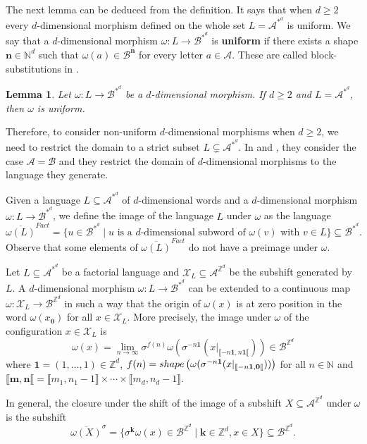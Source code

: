 \documentclass[12pt]{amsart}
\newtheorem{lemma}[definition]{Lemma}
\newcommand{\N}{\mathbb{N}}
\newcommand{\Z}{\mathbb{Z}}
\newcommand{\zero}{{\boldsymbol{0}}}
\newcommand{\UN}{{\boldsymbol{1}}}
\newcommand{\bk}{{\boldsymbol{k}}}
\newcommand{\bn}{{\boldsymbol{n}}}
\newcommand{\Bm}{{\boldsymbol{m}}} %
\newcommand{\Acal}{\mathcal{A}} %
\newcommand{\Bcal}{\mathcal{B}}
\newcommand{\Xcal}{\mathcal{X}} %
\newcommand{\factorialclosure}[1]{{\overline{#1}^{Fact}}}
\newcommand{\shiftclosure}[1]{{\overline{#1}^{\sigma}}}
\newcommand{\shape}{\textsc{shape}}
\newcommand{\ZZrange}[2]{{\llbracket#1,#2\rrbracket}}
\newcommand{\ifnv}[2]{\ifthenelse{\equal{#1}{}}{}{#2}}
\newcommand\defn[2][]{\ifnv{#1}{\index{#1|\textbf}}{\index{#2|\textbf}}\textbf{#2}}
\begin{document}
The next lemma can be deduced from the definition.
It says that when $d\geq 2$ every $d$-dimensional morphism
defined on the whole set $L=\Acal^{*^d}$ is uniform.
We say that a $d$-dimensional morphism $\omega:L\to\Bcal^{*^d}$ is \defn{uniform}
if there exists a shape $\bn\in\N^d$ such that $\omega(a)\in\Bcal^\bn$ for
every letter $a\in\Acal$.
These are called block-substitutions in \cite{frank_introduction_2018}.

\begin{lemma}
Let $\omega:L\to\Bcal^{*^d}$ be a $d$-dimensional morphism.
If $d\geq 2$ and $L=\Acal^{*^d}$, then $\omega$ is uniform.
\end{lemma}

Therefore, to consider non-uniform $d$-dimensional morphisms when $d\geq 2$, we
need to restrict the domain to a strict subset $L\subsetneq\Acal^{*^d}$.
In \cite{MR2579856} and \cite[p.144]{MR1014984}, they consider the case $\Acal=\Bcal$
and they restrict the domain of $d$-dimensional morphisms to the language they
generate.


Given a language $L\subseteq\Acal^{*^d}$ of $d$-dimensional words and 
a $d$-dimensional morphism $\omega:L\to\Bcal^{*^d}$, we define the image of the
language $L$ under $\omega$ as the language
\begin{equation*}
\factorialclosure{\omega(L)}
    = \{u\in\Bcal^{*^d} \mid u\text{ is a $d$-dimensional subword of }
                  \omega(v) \text{ with } v\in L\}
    \subseteq \Bcal^{*^d}.
\end{equation*}
Observe that some elements of 
$\factorialclosure{\omega(L)}$ do not have a preimage under $\omega$.

Let $L\subseteq\Acal^{*^d}$ be a factorial language
and $\Xcal_L\subseteq\Acal^{\Z^d}$ be the subshift generated by $L$.
A $d$-dimensional morphism 
$\omega:L \to\Bcal^{*^d}$ 
can be extended to a continuous map 
$\omega:\Xcal_L\to\Bcal^{\Z^d}$
in such a way that the origin of $\omega(x)$ is at zero position
in the word $\omega(x_\zero)$
for all $x\in\Xcal_L$. More precisely, the image
under $\omega$ of the configuration $x\in\Xcal_L$ is
\[
    \omega(x) =
    \lim_{n\to\infty}\sigma^{f(n)}\omega\left(\sigma^{-n\UN}(x|_{\llbracket-n\UN,n\UN\llbracket})\right)
    \in\Bcal^{\Z^d}
\]
where $\UN=(1,\dots,1)\in\Z^d$,
$f(n)=\shape\left(\omega(\sigma^{-n\UN}(x|_{\llbracket-n\UN,\zero\llbracket}))\right)$
for all $n\in\N$ and
$\llbracket\Bm,\bn\llbracket
=
\ZZrange{m_1}{n_1-1}
\times \cdots \times
\ZZrange{m_d}{n_d-1}$.

In general, the closure under the shift of the image of a subshift
$X\subseteq\Acal^{\Z^d}$ under $\omega$
is the subshift
\begin{equation*}
\shiftclosure{\omega(X)}
    = \{\sigma^\bk\omega(x)\in\Bcal^{\Z^d} \mid \bk\in\Z^d, x\in X\}
    \subseteq \Bcal^{\Z^d}.
\end{equation*}
\end{document}
